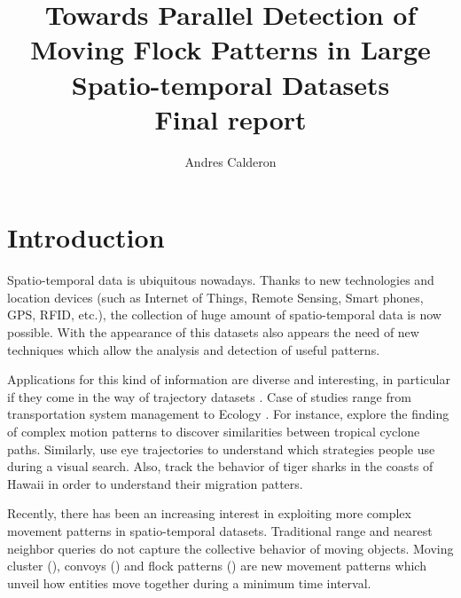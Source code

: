 \documentclass[12pt]{scrartcl}
\title{Towards Parallel Detection of Moving Flock Patterns in Large Spatio-temporal Datasets\\ \normalsize{Final report}}
\author{Andres Calderon}
\begin{document}
\maketitle
 
\section{Introduction}
% 

Spatio-temporal data is ubiquitous nowadays. Thanks to new technologies and location devices (such as Internet of Things, Remote Sensing, Smart phones, GPS, RFID, etc.), the collection of huge amount of spatio-temporal data is now possible. With the appearance of this datasets also appears the need of new techniques which allow the analysis and detection of useful patterns.  

Applications for this kind of information are diverse and interesting, in particular if they come in the way of trajectory datasets \citep{jeung_trajectory_2011, huang_mining_2015}. Case of studies range from transportation system management \citep{di_lorenzo_allaboard:_2016,johansson_efficiency_2015} to Ecology \citep{johnston_abundance_2015, la_sorte_convergence_2016}.  For instance, \cite{turdukulov_visual_2014} explore the finding of complex motion patterns to discover similarities between tropical cyclone paths.  Similarly, \cite{amor_persistence_2016} use eye trajectories to understand which strategies people use during a visual search. Also, \cite{holland_movements_1999} track the behavior of tiger sharks in the coasts of Hawaii in order to understand their migration patters.

Recently, there has been an increasing interest in exploiting more complex movement patterns in spatio-temporal datasets.  Traditional range and nearest neighbor queries do not capture the collective behavior of moving objects.  Moving cluster (\cite{kalnis_discovering_2005}), convoys (\cite{jeung_discovery_2008}) and flock patterns (\cite{benkert_reporting_2008, gudmundsson_computing_2006}) are new movement patterns which unveil how entities move together during a minimum time interval.  
\end{document}
